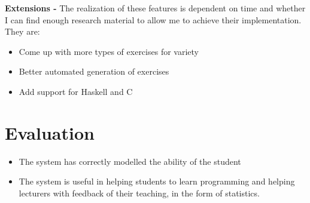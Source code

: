 \documentclass[11pt,a4paper]{report}
\begin{document}
\textbf{Extensions -} The realization of these features is dependent on time and whether I can find enough research material to allow me to achieve their implementation. They are:
\begin{itemize}
\item Come up with more types of exercises for variety
\item Better automated generation of exercises
\item Add support for Haskell and C
\end{itemize}


\chapter{Evaluation}
\begin{itemize}
\item The system has correctly modelled the ability of the student
\item The system is useful in helping students to learn programming and helping lecturers with feedback of their teaching, in the form of statistics.
\end{itemize}

\end{document}
